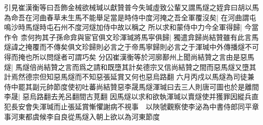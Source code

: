 引見崔漢衡等曰吾飾金械欲械瑊以獻贊普今失瑊虛致公輩又謂馬燧之姪弇曰胡以馬為命吾在河曲春草未生馬不能舉足當是時侍中度河掩之吾全軍覆沒矣|{
	在河曲謂屯鳴沙時馬燧時屯石州不度河燧加侍中故以稱之}
所以求和蒙侍中力今全軍得歸|{
	今當作令}
柰何拘其子孫命弇與宦官俱文珍渾瑊將馬寜俱歸|{
	獨遣弇歸尚結贊雖有此言馬燧諱之掩覆而不傳矣俱文珍歸則必言之于帝馬寧歸則必言之于渾瑊中外傳播燧不可得而掩也所以問燧者可謂巧矣}
分囚崔漢衡等於河廓鄯州上聞尚結贊之言由是惡馬燧|{
	馬燧倍尚結贊之言而爲之請和既墮其計矣德宗又信尚結贊之間而惡馬燧又墮其計焉然德宗但知惡馬燧而不知惡張延賞又何也惡烏路翻}
六月丙戍以馬燧為司徒兼侍中罷其副元帥節度使初吐蕃尚結贊惡李晟馬燧渾瑊曰去三人則唐可圖也於是離間李晟|{
	惡烏路翻去羌呂翻間古莧翻}
因馬燧以求和欲執渾瑊以賣燧使并獲罪因縱兵直犯長安會失渾瑊而止張延賞慚懼謝病不視事　以陜虢觀察使李泌為中書侍郎同平章事河東都虞候李自良從馬燧入朝上欲以為河東節度

